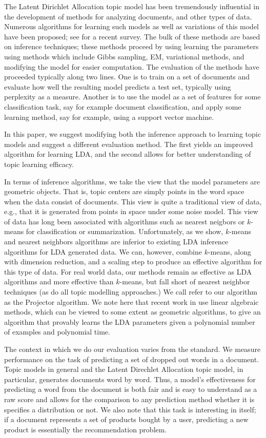 
The Latent Dirichlet Allocation topic model has been tremendously
influential in the development of methods for analyzing documents, and
other types of data.  Numerous algorithms for learning such models as
well as variations of this model have been proposed;
see \cite{BleiCACM} for a recent survey.  The bulk of these methods
are based on inference techniques; these methods proceed by using
learning the parameters using methods which include Gibbs sampling,
EM, variational methods, and modifying the model for easier
computation.  The evaluation of the methods have proceeded typically
along two lines.  One is to train on a set of documents and evaluate
how well the resulting model predicts a test set, typically using
perplexity as a measure.  Another is to use the model as a set of
features for some classification task, say for example document
classification, and apply some learning method, say for example, using
a support vector machine.

In this paper, we suggest modifying both the inference approach to
learning topic models and suggest a different evaluation method.  The
first yields an improved algorithm for learning LDA, and the second
allows for better understanding of topic learning efficacy. 

In terms of inference algorithms, we take the view that the model
parameters are geometric objects.  That is, topic centers are simply
points in the word space when the data consist of documents.  This
view is quite a traditional view of data, e.g., that it is generated
from points in space under some noise model.  This view of data has
long been associated with algorithms such as nearest neigbors or
$k$-means for classification or summarization.  Unfortunately, as we
show, $k$-means and nearest neighbors algorithms are inferior to
existing LDA inference algorithms for LDA generated data.  We can,
however, combine $k$-means, along with dimension reduction, and a
scaling step to produce an effective algorithm for this type of data.
For real world data, our methods remain as effective as LDA algorithms
and more effective than $k$-means, but fall short of nearest neighbor
techniques (as do all topic modelling approaches.) We call refer to
our algorithm as the Projector algorithm.  We note here that recent
work in \cite{AnandLDA} use linear algebraic methods, which can be
viewed to some extent as geometric algorithms, to give an algorithm
that provably learns the LDA parameters given a polynomial
number of examples and polynomial time.

The context in which we do our evaluation varies from the standard.
We measure performance on the task of predicting a set of dropped out
words in a document.  Topic models in general and the Latent Direchlet
Allocation topic model, in particular, generates documents word by
word.  Thus, a model's effectiveness for predicting a word from the
document is both fair and is easy to understand as a raw score and
allows for the comparison to any prediction method whether it is
specifies a distribution or not.  We also note that this task is
interesting in itself; if a document represents a set of products
bought by a user, predicting a new product is essentially the
recommendation problem.

